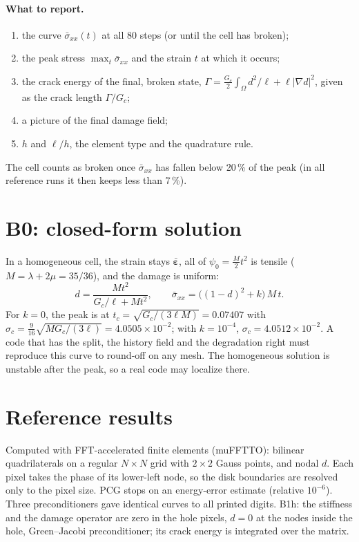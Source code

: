 \documentclass[11pt]{article}
\begin{document}
\paragraph{What to report.}
\begin{enumerate}[nosep]
  \item the curve $\bar\sigma_{xx}(t)$ at all 80 steps (or until the cell has broken);
  \item the peak stress $\max_t \bar\sigma_{xx}$ and the strain $t$ at which it occurs;
  \item the crack energy of the final, broken state, $\Gamma = \frac{G_c}{2}\int_\Omega d^2/\ell + \ell|\nabla d|^2$,
        given as the crack length $\Gamma/G_c$;
  \item a picture of the final damage field;
  \item $h$ and $\ell/h$, the element type and the quadrature rule.
\end{enumerate}
The cell counts as broken once $\bar\sigma_{xx}$ has fallen below 20\,\% of the peak (in all reference runs it then
keeps less than 7\,\%).

\section*{B0: closed-form solution}
In a homogeneous cell, the strain stays $\bar{\boldsymbol\varepsilon}$, all of $\psi_0 = \frac{M}{2}t^2$ is tensile
($M = \lambda + 2\mu = 35/36$), and the damage is uniform:
\[
  d = \frac{M t^2}{G_c/\ell + M t^2}, \qquad \bar\sigma_{xx} = \big((1-d)^2 + k\big)\,M\,t .
\]
For $k = 0$, the peak is at $t_c = \sqrt{G_c/(3\ell M)} = 0.07407$ with $\sigma_c = \frac{9}{16}\sqrt{M G_c/(3\ell)} =
4.0505\times10^{-2}$; with $k = 10^{-4}$, $\sigma_c = 4.0512\times10^{-2}$. A code that has the split, the history field
and the degradation right must reproduce this curve to round-off on any mesh. The homogeneous solution is unstable
after the peak, so a real code may localize there.

\section*{Reference results}
Computed with FFT-accelerated finite elements (muFFTTO): bilinear quadrilaterals on a regular $N\times N$ grid with
$2\times2$ Gauss points, and nodal $d$. Each pixel takes the phase of its lower-left node, so the disk boundaries are
resolved only to the pixel size. PCG stops on an energy-error estimate (relative $10^{-6}$). Three preconditioners
gave identical curves to all printed digits. B1h: the stiffness and the damage operator are zero in the hole pixels,
$d = 0$ at the nodes inside the hole, Green--Jacobi preconditioner; its crack energy is integrated over the matrix.
\end{document}
